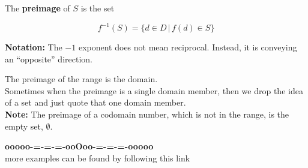 \documentclass{ximera}
\begin{document}
The \textbf{preimage} of $S$ is the set

\[  f^{-1}(S) = \{ d \in D \, | \, f(d) \in S  \}    \]

\textbf{Notation:}  The $-1$ exponent does not mean reciprocal.  Instead, it is conveying an ``opposite'' direction.


The preimage of the range is the domain. \\

Sometimes when the preimage is a single domain member, then we drop the idea of a set and just quote that one domain member. \\


\textbf{Note:} The preimage of a codomain number, which is not in the range, is the empty set, $\emptyset$. \\























\begin{onlineOnly}
\begin{center}
\textbf{\textcolor{green!50!black}{ooooo-=-=-=-ooOoo-=-=-=-ooooo}} \\

more examples can be found by following this link\\ 

\end{center}
\end{onlineOnly}
\end{document}
